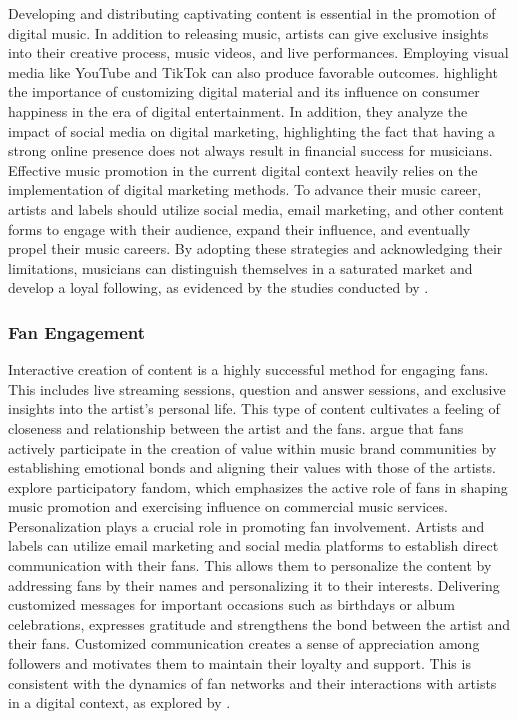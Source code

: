 Developing and distributing captivating content is essential in the promotion of digital music. In addition to releasing music, artists can give exclusive insights into their creative process, music videos, and live performances. Employing visual media like YouTube and TikTok can also produce favorable outcomes. \textcite{basaran22} highlight the importance of customizing digital material and its influence on consumer happiness in the era of digital entertainment. In addition, they analyze the impact of social media on digital marketing, highlighting the fact that having a strong online presence does not always result in financial success for musicians. \\

Effective music promotion in the current digital context heavily relies on the implementation of digital marketing methods. To advance their music career, artists and labels should utilize social media, email marketing, and other content forms to engage with their audience, expand their influence, and eventually propel their music careers. By adopting these strategies and acknowledging their limitations, musicians can distinguish themselves in a saturated market and develop a loyal following, as evidenced by the studies conducted by \textcite{haynes18,basaran22}.

\subsubsection{Fan Engagement}
Interactive creation of content is a highly successful method for engaging fans. This includes live streaming sessions, question and answer sessions, and exclusive insights into the artist's personal life. This type of content cultivates a feeling of closeness and relationship between the artist and the fans. \textcite{edlom21} argue that fans actively participate in the creation of value within music brand communities by establishing emotional bonds and aligning their values with those of the artists. \textcite{lee20} explore participatory fandom, which emphasizes the active role of fans in shaping music promotion and exercising influence on commercial music services. \\

Personalization plays a crucial role in promoting fan involvement. Artists and labels can utilize email marketing and social media platforms to establish direct communication with their fans. This allows them to personalize the content by addressing fans by their names and personalizing it to their interests. Delivering customized messages for important occasions such as birthdays or album celebrations, expresses gratitude and strengthens the bond between the artist and their fans. Customized communication creates a sense of appreciation among followers and motivates them to maintain their loyalty and support. This is consistent with the dynamics of fan networks and their interactions with artists in a digital context, as explored by \textcite{edlom21}. \\

